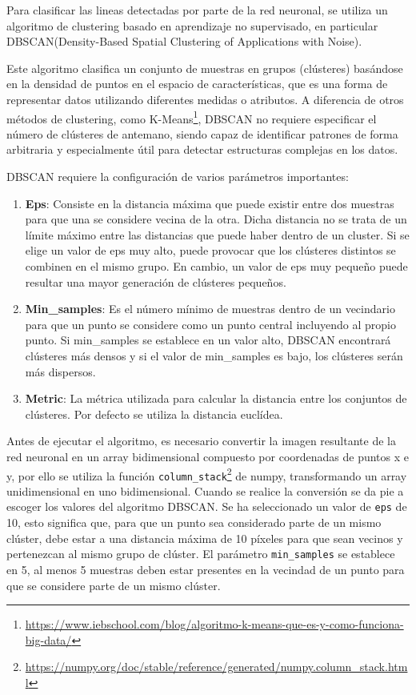 Para clasificar las lineas detectadas por parte de la red neuronal, se utiliza un algoritmo de clustering basado en aprendizaje no supervisado, en particular
DBSCAN(Density-Based Spatial Clustering of Applications with Noise)\cite{ski_dbs}.

Este algoritmo clasifica un conjunto de muestras en grupos (clústeres) basándose en la densidad de puntos en el espacio de características, que es una forma de representar
datos utilizando diferentes medidas o atributos. A diferencia de otros métodos de clustering, como K-Means\footnote{\url{https://www.iebschool.com/blog/algoritmo-k-means-que-es-y-como-funciona-big-data/}}, 
DBSCAN no requiere especificar el número de clústeres de antemano, 
siendo capaz de identificar patrones de forma arbitraria y especialmente útil para detectar estructuras complejas en los datos. 

DBSCAN requiere la configuración de varios parámetros importantes:
\begin{enumerate}
  \item \textbf{Eps}: Consiste en la distancia máxima que puede existir entre dos muestras para que una se considere vecina de la otra. Dicha distancia no se trata de un límite 
  máximo entre las distancias que puede haber dentro de un cluster. Si se elige un valor de eps muy alto, puede provocar que los clústeres distintos se combinen en el mismo grupo. 
  En cambio, un valor de eps muy pequeño puede resultar una mayor generación de clústeres pequeños.
  \item \textbf{Min\_samples}: Es el número mínimo de muestras dentro de un vecindario para que un punto se considere como un punto central incluyendo al propio punto.
  Si min\_samples se establece en un valor alto, DBSCAN encontrará clústeres más densos y 
  si el valor de min\_samples es bajo, los clústeres serán más dispersos.
  \item \textbf{Metric}: La métrica utilizada para calcular la distancia entre los conjuntos de clústeres. Por defecto se utiliza la distancia euclídea. 
\end{enumerate}

Antes de ejecutar el algoritmo, es necesario convertir la imagen resultante de la red neuronal en un array bidimensional compuesto por coordenadas de puntos x e y, por ello se utiliza
la función \texttt{column\_stack}\footnote{\url{https://numpy.org/doc/stable/reference/generated/numpy.column_stack.html}} de numpy, transformando un array
unidimensional en uno bidimensional. Cuando se realice la conversión se da pie a escoger los valores del algoritmo DBSCAN. Se ha seleccionado un valor de \texttt{eps} de 10, esto significa que, 
para que un punto sea considerado parte de un mismo clúster, debe estar a una distancia máxima de 10 píxeles para que sean vecinos y pertenezcan al mismo grupo de clúster. 
El parámetro \texttt{min\_samples} se establece en 5, al menos 5 muestras 
deben estar presentes en la vecindad de un punto para que se considere parte de un mismo clúster. 

